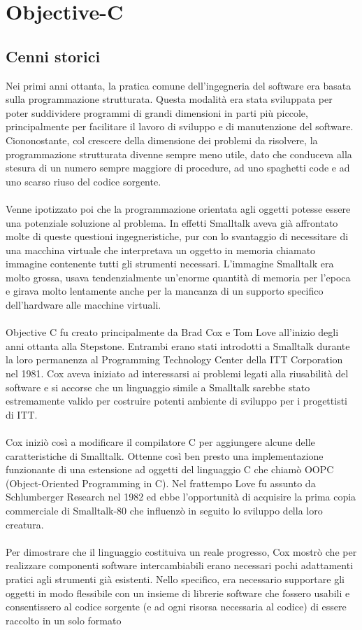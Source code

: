\chapter{Objective-C}
\section{Cenni storici}
Nei primi anni ottanta, la pratica comune dell'ingegneria del software era basata sulla programmazione strutturata. Questa modalità era stata sviluppata per poter suddividere programmi di grandi dimensioni in parti più piccole, principalmente per facilitare il lavoro di sviluppo e di manutenzione del software. Ciononostante, col crescere della dimensione dei problemi da risolvere, la programmazione strutturata divenne sempre meno utile, dato che conduceva alla stesura di un numero sempre maggiore di procedure, ad uno spaghetti code e ad uno scarso riuso del codice sorgente.\\\\Venne ipotizzato poi che la programmazione orientata agli oggetti potesse essere una potenziale soluzione al problema. In effetti Smalltalk aveva già affrontato molte di queste questioni ingegneristiche, pur con lo svantaggio di necessitare di una macchina virtuale che interpretava un oggetto in memoria chiamato immagine contenente tutti gli strumenti necessari. L'immagine Smalltalk era molto grossa, usava tendenzialmente un'enorme quantità di memoria per l'epoca e girava molto lentamente anche per la mancanza di un supporto specifico dell'hardware alle macchine virtuali.\\\\Objective C fu creato principalmente da Brad Cox e Tom Love all'inizio degli anni ottanta alla Stepstone. Entrambi erano stati introdotti a Smalltalk durante la loro permanenza al Programming Technology Center della ITT Corporation nel 1981. Cox aveva iniziato ad interessarsi ai problemi legati alla riusabilità del software e si accorse che un linguaggio simile a Smalltalk sarebbe stato estremamente valido per costruire potenti ambiente di sviluppo per i progettisti di ITT.\\\\Cox iniziò così a modificare il compilatore C per aggiungere alcune delle caratteristiche di Smalltalk. Ottenne così ben presto una implementazione funzionante di una estensione ad oggetti del linguaggio C che chiamò OOPC (Object-Oriented Programming in C). Nel frattempo Love fu assunto da Schlumberger Research nel 1982 ed ebbe l'opportunità di acquisire la prima copia commerciale di Smalltalk-80 che influenzò in seguito lo sviluppo della loro creatura.\\\\Per dimostrare che il linguaggio costituiva un reale progresso, Cox mostrò che per realizzare componenti software intercambiabili erano necessari pochi adattamenti pratici agli strumenti già esistenti. Nello specifico, era necessario supportare gli oggetti in modo flessibile con un insieme di librerie software che fossero usabili e consentissero al codice sorgente (e ad ogni risorsa necessaria al codice) di essere raccolto in un solo formato 
